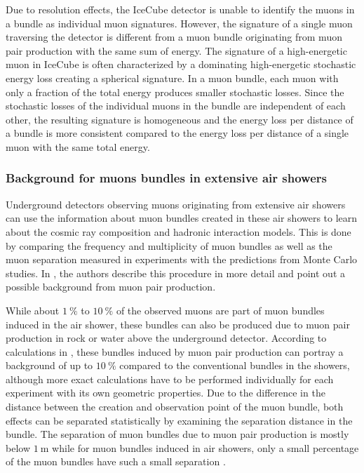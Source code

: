 Due to resolution effects, the IceCube detector is unable to identify the muons in a bundle as individual muon signatures.
However, the signature of a single muon traversing the detector is different from a muon bundle originating from muon pair production with the same sum of energy.
The signature of a high-energetic muon in IceCube is often characterized by a dominating high-energetic stochastic energy loss creating a spherical signature.
In a muon bundle, each muon with only a fraction of the total energy produces smaller stochastic losses.
Since the stochastic losses of the individual muons in the bundle are independent of each other, the resulting signature is homogeneous and the energy loss per distance of a bundle is more consistent compared to the energy loss per distance of a single muon with the same total energy. 

\subsubsection{Background for muons bundles in extensive air showers}

Underground detectors observing muons originating from extensive air showers can use the information about muon bundles created in these air showers to learn about the cosmic ray composition and hadronic interaction models.
This is done by comparing the frequency and multiplicity of muon bundles as well as the muon separation measured in experiments with the predictions from Monte Carlo studies.
In \cite{MupairInRock}, the authors describe this procedure in more detail and point out a possible background from muon pair production.

While about $\SI{1}{\percent}$ to $\SI{10}{\percent}$ of the observed muons are part of muon bundles induced in the air shower, these bundles can also be produced due to muon pair production in rock or water above the underground detector.
According to calculations in \cite{MupairInRock}, these bundles induced by muon pair production can portray a background of up to $\SI{10}{\percent}$ compared to the conventional bundles in the showers, although more exact calculations have to be performed individually for each experiment with its own geometric properties.
Due to the difference in the distance between the creation and observation point of the muon bundle, both effects can be separated statistically by examining the separation distance in the bundle.
The separation of muon bundles due to muon pair production is mostly below $\SI{1}{\metre}$ while for muon bundles induced in air showers, only a small percentage of the muon bundles have such a small separation \cite{MupairInRock}.

